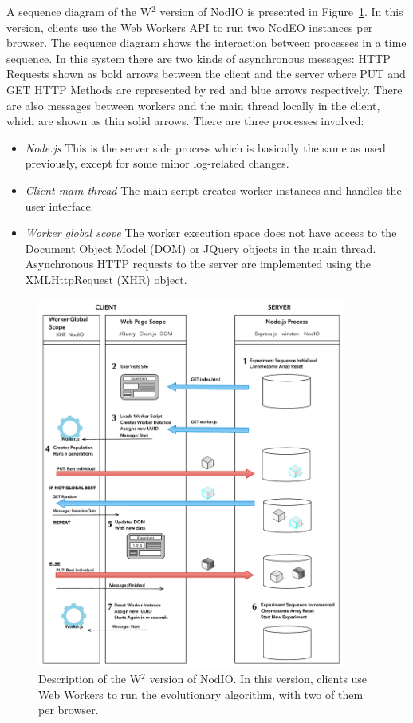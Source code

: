 \documentclass[journal,onecolumn]{IEEEtran}
\begin{document}
A sequence diagram of the W$^2$ version of {\sf NodIO} is presented
in Figure~\ref{fig:system:w2}. In this version, clients use the Web Workers
API to run two {\sf NodEO} instances per browser. The sequence diagram shows the
interaction between processes in a time sequence. In this system there are
two kinds of asynchronous messages: HTTP Requests shown as bold arrows between
the client and the server where PUT and GET HTTP Methods are represented by
red and blue arrows respectively. There are also messages between workers and
the main thread locally in the client, which are shown as thin solid arrows.
There are three processes involved:
\begin{itemize}
\item {\em Node.js} This is the server side process which is basically
  the same as used previously, except for some minor log-related
  changes. 
\item {\em Client main thread} The main script creates
worker instances and handles the user interface.
\item {\em Worker global scope} The worker execution space does not have
access to the Document Object Model (DOM) or JQuery objects in the main thread.
Asynchronous HTTP requests to the server are implemented using the
XMLHttpRequest (XHR) object.  
\end{itemize}
%
\begin{figure}[!htb]
\centering
\includegraphics[width=4in]{Algorithm.pdf}
\caption{Description of the W$^2$ version of {\sf NodIO}. In this
  version, clients use Web Workers to run the evolutionary algorithm,
  with two of them per browser.}
\label{fig:system:w2}
\end{figure}
\end{document}
